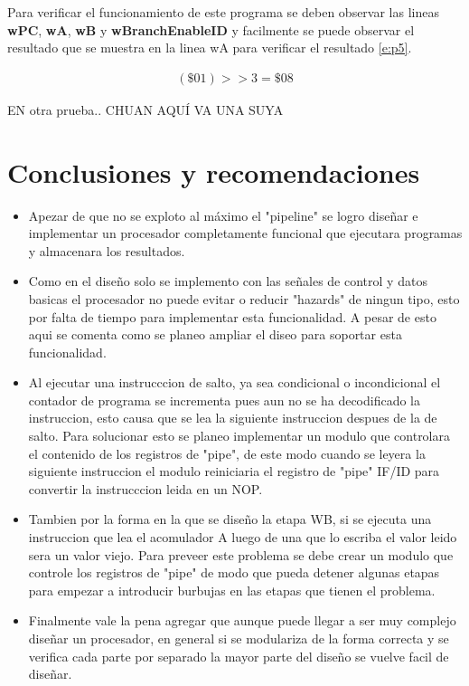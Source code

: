 \documentclass[paper=letter, fontsize=12pt]{article}
\begin{document}
Para verificar el funcionamiento de este programa se deben observar las lineas \textbf{wPC}, \textbf{wA}, \textbf{wB} y \textbf{wBranchEnableID} y facilmente se puede observar el resultado que se muestra en la linea wA para verificar el resultado \ref{e:p5}.

\begin{align} 
\label{e:p5}
(\$01) >> 3 = \$08
\end{align}

EN otra prueba.. CHUAN AQUÍ VA UNA SUYA

\clearpage
\section{Conclusiones y recomendaciones}

\begin{itemize}
\item Apezar de que no se exploto al máximo el "pipeline" se logro diseñar e implementar un procesador completamente funcional que ejecutara programas y almacenara los resultados.\\


\item Como en el diseño solo se implemento con las señales de control y datos basicas el procesador no puede evitar o reducir "hazards" de ningun tipo, esto por falta de tiempo para implementar esta funcionalidad. A pesar de esto aqui se comenta como se planeo ampliar el diseo para soportar esta funcionalidad.\\

\item Al ejecutar una instrucccion de salto, ya sea condicional o incondicional el contador de programa se incrementa pues aun no se ha decodificado la instruccion, esto causa que se lea la siguiente instruccion despues de la de salto. Para solucionar esto se planeo implementar un modulo que controlara el contenido de los registros de "pipe", de este modo cuando se leyera la siguiente instruccion el modulo reiniciaria el registro de "pipe" IF/ID para convertir la instrucccion leida en un NOP.\\

\item Tambien por la forma en la que se diseño la etapa WB, si se ejecuta una instruccion que lea el acomulador A luego de una que lo escriba el valor leido sera un valor viejo. Para preveer este problema se debe crear un modulo que controle los registros de "pipe" de modo que pueda detener algunas etapas para empezar a introducir burbujas en las etapas que tienen el problema.\\

\item Finalmente vale la pena agregar que aunque puede llegar a ser muy complejo diseñar un procesador, en general si se modulariza de la forma correcta y se verifica cada parte por separado la mayor parte del diseño se vuelve facil de diseñar.
\end{itemize}
\end{document}
